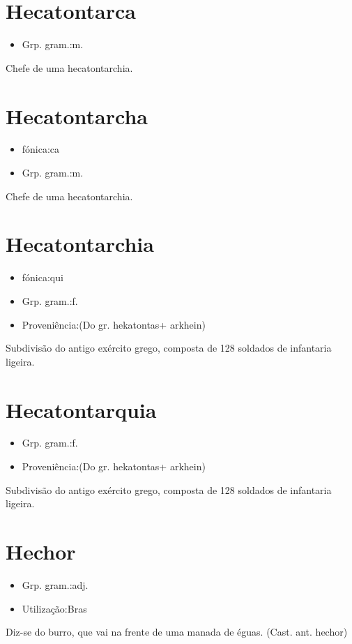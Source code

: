 \documentclass{article}
\begin{document}
\section{Hecatontarca}
\begin{itemize}
\item {Grp. gram.:m.}
\end{itemize}
Chefe de uma hecatontarchia.
\section{Hecatontarcha}
\begin{itemize}
\item {fónica:ca}
\end{itemize}
\begin{itemize}
\item {Grp. gram.:m.}
\end{itemize}
Chefe de uma hecatontarchia.
\section{Hecatontarchia}
\begin{itemize}
\item {fónica:qui}
\end{itemize}
\begin{itemize}
\item {Grp. gram.:f.}
\end{itemize}
\begin{itemize}
\item {Proveniência:(Do gr. \textunderscore hekatontas\textunderscore  + \textunderscore arkhein\textunderscore )}
\end{itemize}
Subdivisão do antigo exército grego, composta de 128 soldados de infantaria ligeira.
\section{Hecatontarquia}
\begin{itemize}
\item {Grp. gram.:f.}
\end{itemize}
\begin{itemize}
\item {Proveniência:(Do gr. \textunderscore hekatontas\textunderscore  + \textunderscore arkhein\textunderscore )}
\end{itemize}
Subdivisão do antigo exército grego, composta de 128 soldados de infantaria ligeira.
\section{Hechor}
\begin{itemize}
\item {Grp. gram.:adj.}
\end{itemize}
\begin{itemize}
\item {Utilização:Bras}
\end{itemize}
Diz-se do burro, que vai na frente de uma manada de éguas.
(Cast. ant. \textunderscore hechor\textunderscore )
\end{document}
